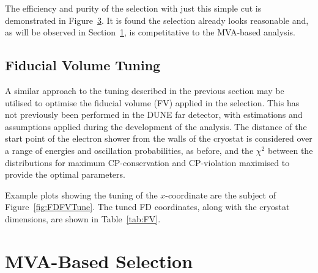 The efficiency and purity of the selection with just this simple cut is demonstrated in Figure~\ref{fig:FDCutEffPur}.  It is found the selection already looks reasonable and, as will be observed in Section~\ref{sec:FDMVA}, is competitative to the MVA-based analysis.

\begin{figure}
  \centering
  \begin{subfigure}[t]{0.48\linewidth}
    \centering
    \caption{}
    \label{fig:FDCutEff}
  \end{subfigure}
  \hfill
  \begin{subfigure}[t]{0.48\linewidth}
    \centering
    \caption{}
    \label{fig:FDCutPur}
  \end{subfigure}
  \caption{}
  \label{fig:FDCutEffPur}
\end{figure}

\subsection{Fiducial Volume Tuning}\label{sec:FDCutFV}

A similar approach to the tuning described in the previous section may be utilised to optimise the fiducial volume (FV) applied in the selection.  This has not previously been performed in the DUNE far detector, with estimations and assumptions applied during the development of the analysis.  The distance of the start point of the electron shower from the walls of the cryostat is considered over a range of energies and oscillation probabilities, as before, and the $\chi^2$ between the distributions for maximum CP-conservation and CP-violation maximised to provide the optimal parameters.

Example plots showing the tuning of the $x$-coordinate are the subject of Figure~\ref{fig:FDFVTune}.  The tuned FD coordinates, along with the cryostat dimensions, are shown in Table~\ref{tab:FV}.

\section{MVA-Based Selection}\label{sec:FDMVA}

